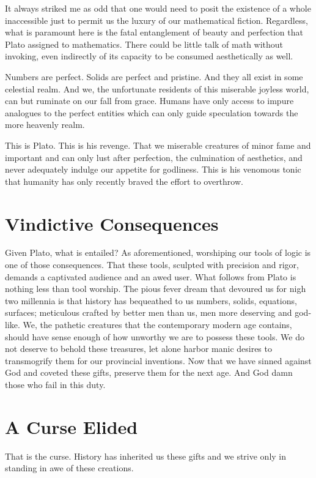 \documentclass{article}
\begin{document}
	It always striked me as odd that one would need to posit the existence of a whole inaccessible just to permit us the luxury of our mathematical fiction. Regardless, what is paramount here is the fatal entanglement of beauty and perfection that Plato assigned to mathematics. There could be little talk of math without invoking, even indirectly of its capacity to be consumed aesthetically as well.
	
	Numbers are perfect. Solids are perfect and pristine. And they all exist in some celestial realm. And we, the unfortunate residents of this miserable joyless world, can but ruminate on our fall from grace. Humans have only access to impure analogues to the perfect entities which can only guide speculation towards the more heavenly realm.
	
	This is Plato. This is his revenge. That we miserable creatures of minor fame and important and can only lust after perfection, the culmination of aesthetics, and never adequately indulge our appetite for godliness. This is his venomous tonic that humanity has only recently braved the effort to overthrow.
	
	\section{Vindictive Consequences}
	
	Given Plato, what is entailed? As aforementioned, worshiping our tools of logic is one of those consequences. That these tools, sculpted with precision and rigor, demands a captivated audience and an awed user. What follows from Plato is nothing less than tool worship. The pious fever dream that devoured us for nigh two millennia is that history has bequeathed to us numbers, solids, equations, surfaces; meticulous crafted by better men than us, men more deserving and god-like. We, the pathetic creatures that the contemporary modern age contains, should have sense enough of how unworthy we are to possess these tools. We do not deserve to behold these treasures, let alone harbor manic desires to transmogrify them for our provincial inventions. Now that we have sinned against God and coveted these gifts, preserve them for the next age. And God damn those who fail in this duty.
	
	\section{A Curse Elided}
	
	That is the curse. History has inherited us these gifts and we strive only in standing in awe of these creations.
	
\end{document}
